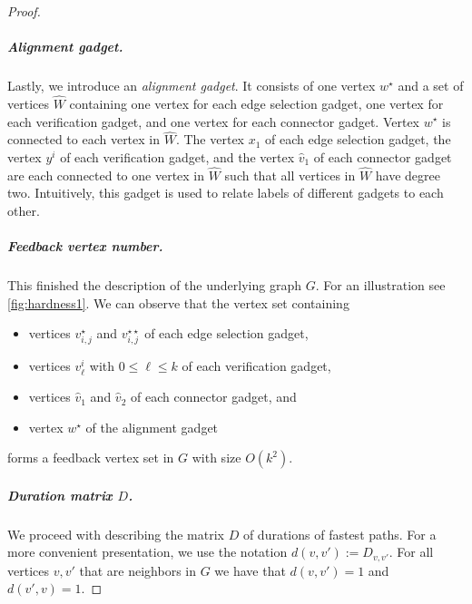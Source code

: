 \documentclass[a4paper,UKenglish,cleveref, autoref, thm-restate]{lipics-v2021}
\begin{document}
\begin{proof}
\subparagraph{Alignment gadget.} Lastly, we introduce an \emph{alignment gadget}. It consists of one vertex $w^\star$ and a set of vertices $\hat{W}$ containing one vertex for each edge selection gadget, one vertex for each verification gadget, and one vertex for each connector gadget. Vertex $w^\star$ is connected to each vertex in $\hat{W}$.
The vertex $x_1$ of each edge selection gadget, the vertex $y^i$ of each verification gadget, and the vertex $\hat{v}_1$ of each connector gadget are each connected to  one vertex in $\hat{W}$ such that all vertices in $\hat{W}$ have degree two. Intuitively, this gadget is used to relate labels of different gadgets to each other. 

\subparagraph{Feedback vertex number.} This finished the description of the underlying graph $G$. For an illustration see \cref{fig:hardness1}. We can observe that the vertex set containing
\begin{itemize}
    \item vertices $v_{i,j}^\star$ and $v_{i,j}^{\star\star}$ of each edge selection gadget,
    \item vertices $v^i_\ell$ with $0\le \ell\le k$ of each verification gadget,
    \item vertices $\hat{v}_1$ and $\hat{v}_2$ of each connector gadget, and
    \item vertex $w^\star$ of the alignment gadget
\end{itemize}
forms a feedback vertex set in $G$ with size $O(k^2)$.

\subparagraph{\boldmath Duration matrix $D$.} We proceed with describing the matrix $D$ of durations of fastest paths. For a more convenient presentation, we use the notation $d(v,v'):= D_{v,v'}$. For all vertices $v,v'$ that are neighbors in $G$ we have that $d(v,v')=1$ and $d(v',v)=1$.


\end{proof}
\end{document}
